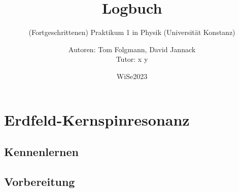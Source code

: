 \documentclass[
    twoside=true, 
    footinclude=off, 
    captions=tableheading, 
    DIV=12;usenames,
    dvipsnames
]{scrbook}
\begin{document}
    \title{Logbuch}
    \subtitle{(Fortgeschrittenen) Praktikum 1 in Physik (Universität Konstanz)}
    \author{Autoren: Tom Folgmann, David Jannack \\ \large{Tutor: x y}}
    \date{WiSe2023}
    \maketitle
    \thispagestyle{empty}

    \newpage


    \tableofcontents

\newtheorem{quest}{Vorbereitungsthema}
\newtheorem{answ}{Antwort }
\newenvironment{Frage}{%
    \begin{center}
        \dotfill\parskip1em

        \begin{minipage}{0.95\textwidth}
            \begin{quest}\end{quest}
}{
        \end{minipage}\par
        \dotfill
    \end{center}
}
\newenvironment{Antwort}{

}{

}



\newpage

\chapter{Erdfeld-Kernspinresonanz}
    \section{Kennenlernen}
        

    \newpage
    \section{Vorbereitung}
        
\end{document}
